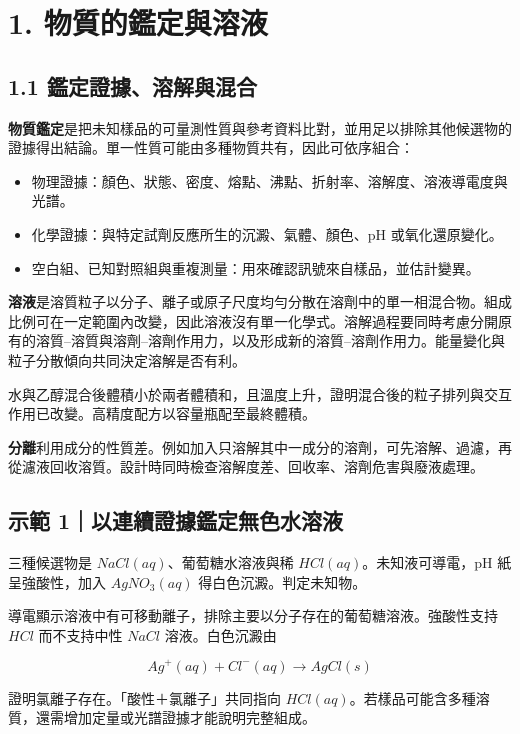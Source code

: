 \documentclass[11pt,a4paper]{article}
\providecommand{\tightlist}{%
  \setlength{\itemsep}{0pt}\setlength{\parskip}{0pt}}
\begin{document}
\section{1. 物質的鑑定與溶液}\label{ux7269ux8ceaux7684ux9451ux5b9aux8207ux6eb6ux6db2}

\subsection{1.1 鑑定證據、溶解與混合}\label{ux9451ux5b9aux8b49ux64daux6eb6ux89e3ux8207ux6df7ux5408}

\textbf{物質鑑定}是把未知樣品的可量測性質與參考資料比對，並用足以排除其他候選物的證據得出結論。單一性質可能由多種物質共有，因此可依序組合：

\begin{itemize}
\tightlist
\item
  物理證據：顏色、狀態、密度、熔點、沸點、折射率、溶解度、溶液導電度與光譜。
\item
  化學證據：與特定試劑反應所生的沉澱、氣體、顏色、pH 或氧化還原變化。
\item
  空白組、已知對照組與重複測量：用來確認訊號來自樣品，並估計變異。
\end{itemize}

\textbf{溶液}是溶質粒子以分子、離子或原子尺度均勻分散在溶劑中的單一相混合物。組成比例可在一定範圍內改變，因此溶液沒有單一化學式。溶解過程要同時考慮分開原有的溶質--溶質與溶劑--溶劑作用力，以及形成新的溶質--溶劑作用力。能量變化與粒子分散傾向共同決定溶解是否有利。

水與乙醇混合後體積小於兩者體積和，且溫度上升，證明混合後的粒子排列與交互作用已改變。高精度配方以容量瓶配至最終體積。

\textbf{分離}利用成分的性質差。例如加入只溶解其中一成分的溶劑，可先溶解、過濾，再從濾液回收溶質。設計時同時檢查溶解度差、回收率、溶劑危害與廢液處理。

\begin{HandoutWorkedExample}

\subsection{示範 1｜以連續證據鑑定無色水溶液}\label{ux793aux7bc4-1ux4ee5ux9023ux7e8cux8b49ux64daux9451ux5b9aux7121ux8272ux6c34ux6eb6ux6db2}

三種候選物是 \(NaCl(aq)\)、葡萄糖水溶液與稀 \(HCl(aq)\)。未知液可導電，pH 紙呈強酸性，加入 \(AgNO_3(aq)\) 得白色沉澱。判定未知物。

導電顯示溶液中有可移動離子，排除主要以分子存在的葡萄糖溶液。強酸性支持 \(HCl\) 而不支持中性 \(NaCl\) 溶液。白色沉澱由

\[
Ag^+(aq)+Cl^-(aq)\rightarrow AgCl(s)
\]

證明氯離子存在。「酸性＋氯離子」共同指向 \(HCl(aq)\)。若樣品可能含多種溶質，還需增加定量或光譜證據才能說明完整組成。

\end{HandoutWorkedExample}
\end{document}
